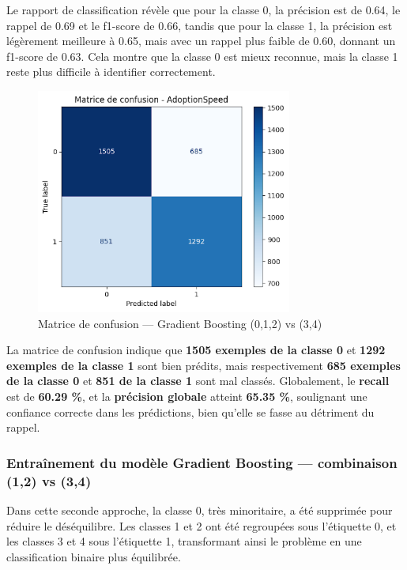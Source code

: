 \documentclass[a4paper,12pt]{article}
\begin{document}
Le rapport de classification révèle que pour la classe 0, la précision est de 0.64, le rappel de 0.69 et le f1-score de 0.66, tandis que pour la classe 1, la précision est légèrement meilleure à 0.65, mais avec un rappel plus faible de 0.60, donnant un f1-score de 0.63. Cela montre que la classe 0 est mieux reconnue, mais la classe 1 reste plus difficile à identifier correctement.

\begin{figure}[H]
    \centering
    \includegraphics[width=0.75\textwidth]{confusion_matrix_gb_012_vs_34.png}
    \caption{Matrice de confusion — Gradient Boosting (0,1,2) vs (3,4)}
    \label{fig:gb_confusion_012_34}
\end{figure}

La matrice de confusion indique que \textbf{1505 exemples de la classe 0} et \textbf{1292 exemples de la classe 1} sont bien prédits, mais respectivement \textbf{685 exemples de la classe 0} et \textbf{851 de la classe 1} sont mal classés. Globalement, le \textbf{recall} est de \textbf{60.29 \%}, et la \textbf{précision globale} atteint \textbf{65.35 \%}, soulignant une confiance correcte dans les prédictions, bien qu'elle se fasse au détriment du rappel.

\subsubsection{Entraînement du modèle Gradient Boosting — combinaison (1,2) vs (3,4)}

Dans cette seconde approche, la classe 0, très minoritaire, a été supprimée pour réduire le déséquilibre. Les classes 1 et 2 ont été regroupées sous l’étiquette 0, et les classes 3 et 4 sous l’étiquette 1, transformant ainsi le problème en une classification binaire plus équilibrée.
\end{document}
